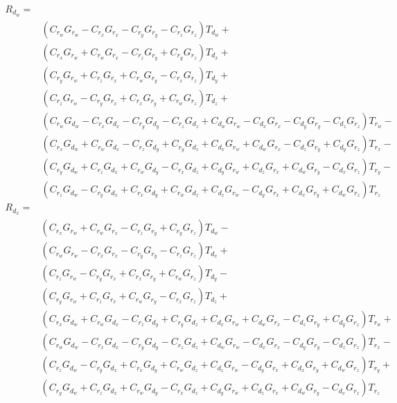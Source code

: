 \documentclass[12pt]{article}
\begin{document}
	\begin{equation}
		\begin{split}
			R_{d_w} = \\&
			(C_{r_w} G_{r_w} - C_{r_x} G_{r_x} - C_{r_y} G_{r_y} - 
			C_{r_z} G_{r_z}) T_{d_w} +\\& (C_{r_x} G_{r_w} + 
			C_{r_w} G_{r_x} - C_{r_z} G_{r_y} + 
			C_{r_y} G_{r_z}) T_{d_x} + \\&(C_{r_y} G_{r_w} + 
			C_{r_z} G_{r_x} + C_{r_w} G_{r_y} - 
			C_{r_x} G_{r_z}) T_{d_y} +\\& (C_{r_z} G_{r_w} - 
			C_{r_y} G_{r_x} + C_{r_x} G_{r_y} + 
			C_{r_w} G_{r_z}) T_{d_z} +\\& (C_{r_w} G_{d_w} - 
			C_{r_x} G_{d_x} - C_{r_y} G_{d_y} - C_{r_z} G_{d_z} + 
			C_{d_w} G_{r_w} - C_{d_x} G_{r_x} - C_{d_y} G_{r_y} - 
			C_{d_z} G_{r_z}) T_{r_w} -\\& (C_{r_x} G_{d_w} + 
			C_{r_w} G_{d_x} - C_{r_z} G_{d_y} + C_{r_y} G_{d_z} + 
			C_{d_x} G_{r_w} + C_{d_w} G_{r_x} - C_{d_z} G_{r_y} + 
			C_{d_y} G_{r_z}) T_{r_x} -\\& (C_{r_y} G_{d_w} + 
			C_{r_z} G_{d_x} + C_{r_w} G_{d_y} - C_{r_x} G_{d_z} + 
			C_{d_y} G_{r_w} + C_{d_z} G_{r_x} + C_{d_w} G_{r_y} - 
			C_{d_x} G_{r_z}) T_{r_y} - \\&(C_{r_z} G_{d_w} - 
			C_{r_y} G_{d_x} + C_{r_x} G_{d_y} + C_{r_w} G_{d_z} + 
			C_{d_z} G_{r_w} - C_{d_y} G_{r_x} + C_{d_x} G_{r_y} + 
			C_{d_w} G_{r_z}) T_{r_z}
		\end{split}
		\label{eq:rdw}
	\end{equation}
	\begin{equation}
		\begin{split}
			R_{d_x} = \\&
			(C_{r_x} G_{r_w} + 
			C_{r_w} G_{r_x} - C_{r_z} G_{r_y} + 
			C_{r_y} G_{r_z}) T_{d_w} -\\& (C_{r_w} G_{r_w} - 
			C_{r_x} G_{r_x} - C_{r_y} G_{r_y} - 
			C_{r_z} G_{r_z}) T_{d_x} +\\& (C_{r_z} G_{r_w} - 
			C_{r_y} G_{r_x} + C_{r_x} G_{r_y} + 
			C_{r_w} G_{r_z}) T_{d_y} - \\&(C_{r_y} G_{r_w} + 
			C_{r_z} G_{r_x} + C_{r_w} G_{r_y} - 
			C_{r_x} G_{r_z}) T_{d_z} +\\& (C_{r_x} G_{d_w} + 
			C_{r_w} G_{d_x} - C_{r_z} G_{d_y} + C_{r_y} G_{d_z} + 
			C_{d_x} G_{r_w} + C_{d_w} G_{r_x} - C_{d_z} G_{r_y} + 
			C_{d_y} G_{r_z}) T_{r_w} + \\&(C_{r_w} G_{d_w} - 
			C_{r_x} G_{d_x} - C_{r_y} G_{d_y} - C_{r_z} G_{d_z} + 
			C_{d_w} G_{r_w} - C_{d_x} G_{r_x} - C_{d_y} G_{r_y} - 
			C_{d_z} G_{r_z}) T_{r_x} - \\&(C_{r_z} G_{d_w} - 
			C_{r_y} G_{d_x} + C_{r_x} G_{d_y} + C_{r_w} G_{d_z} + 
			C_{d_z} G_{r_w} - C_{d_y} G_{r_x} + C_{d_x} G_{r_y} + 
			C_{d_w} G_{r_z}) T_{r_y} + \\&(C_{r_y} G_{d_w} + 
			C_{r_z} G_{d_x} + C_{r_w} G_{d_y} - C_{r_x} G_{d_z} + 
			C_{d_y} G_{r_w} + C_{d_z} G_{r_x} + C_{d_w} G_{r_y} - 
			C_{d_x} G_{r_z}) T_{r_z}
		\end{split}
		\label{eq:rdx}
	\end{equation}
\end{document}
